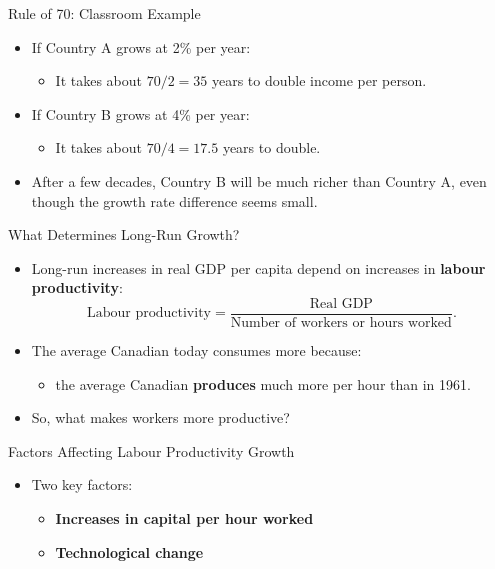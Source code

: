 \documentclass[aspectratio=169]{beamer}
\begin{document}
\begin{frame}{Rule of 70: Classroom Example}
\transfade
\begin{itemize}
  \item If Country A grows at 2\% per year:
  \begin{itemize}
    \item It takes about \(70/2 = 35\) years to double income per person.
  \end{itemize}
  \item If Country B grows at 4\% per year:
  \begin{itemize}
    \item It takes about \(70/4 = 17.5\) years to double.
  \end{itemize}
  \item After a few decades, Country B will be much richer than Country A, even though the growth rate difference seems small.
\end{itemize}
\end{frame}


\begin{frame}{What Determines Long-Run Growth?}
\transfade
\begin{itemize}
  \item Long-run increases in real GDP per capita depend on increases in \textbf{labour productivity}:
  \[
    \text{Labour productivity} =
    \frac{\text{Real GDP}}{\text{Number of workers or hours worked}}.
  \]
  \item The average Canadian today consumes more because:
  \begin{itemize}
    \item the average Canadian \textbf{produces} much more per hour than in 1961.
  \end{itemize}
  \item So, what makes workers more productive?
\end{itemize}
\end{frame}

\begin{frame}{Factors Affecting Labour Productivity Growth}
\transfade
\begin{itemize}
  \item Two key factors:
  \begin{itemize}
    \item \textbf{Increases in capital per hour worked}
    \item \textbf{Technological change}
  \end{itemize}
\end{itemize}
\end{frame}
\end{document}
